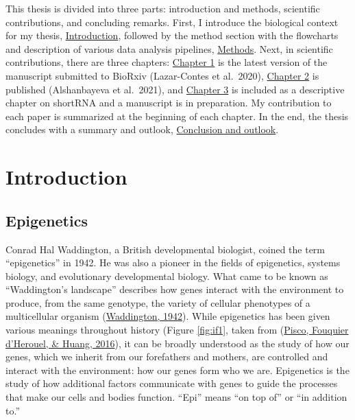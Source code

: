 \documentclass[12pt,twoside]{reedthesis}
\begin{document}
This thesis is divided into three parts: introduction and methods, scientific contributions, and concluding remarks. First, I introduce the biological context for my thesis, \protect\hyperlink{intro}{Introduction}, followed by the method section with the flowcharts and description of various data analysis pipelines, \protect\hyperlink{methods}{Methods}. Next, in scientific contributions, there are three chapters: \protect\hyperlink{chapter1}{Chapter 1} is the latest version of the manuscript submitted to BioRxiv (Lazar-Contes et al.~2020), \protect\hyperlink{chapter2}{Chapter 2} is published (Alshanbayeva et al.~2021), and \protect\hyperlink{chapter3}{Chapter 3} is included as a descriptive chapter on shortRNA and a manuscript is in preparation. My contribution to each paper is summarized at the beginning of each chapter. In the end, the thesis concludes with a summary and outlook, \protect\hyperlink{conclusion}{Conclusion and outlook}.

\hypertarget{intro}{%
\chapter*{Introduction}\label{intro}}

\hypertarget{epigenetics}{%
\section*{Epigenetics}\label{epigenetics}}

Conrad Hal Waddington, a British developmental biologist, coined the
term ``epigenetics'' in 1942. He was also a pioneer in the fields of
epigenetics, systems biology, and evolutionary developmental biology.
What came to be known as ``Waddington's landscape'' describes how genes
interact with the environment to produce, from the same genotype, the
variety of cellular phenotypes of a multicellular organism
(\protect\hyperlink{ref-waddington_1942}{Waddington, 1942}). While epigenetics has been given various meanings
throughout history (Figure \ref{fig:if1}, taken from (\protect\hyperlink{ref-pisco2016}{Pisco, Fouquier d'Herouel, \& Huang, 2016}), it
can be broadly understood as the study of how our genes, which we
inherit from our forefathers and mothers, are controlled and interact
with the environment: how our genes form who we are. Epigenetics is the
study of how additional factors communicate with genes to guide the
processes that make our cells and bodies function. ``Epi'' means ``on top
of'' or ``in addition to.''
\end{document}

